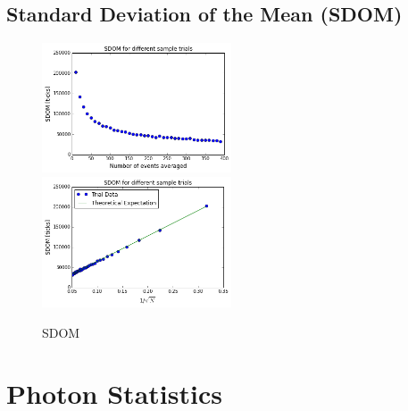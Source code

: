 \documentclass[authoryear, 12pt,5p, Times]{elsarticle}
\begin{document}
	\subsection{Standard Deviation of the Mean (SDOM)}
	 	\begin{figure}[h]
		\includegraphics[width=0.5\textwidth]{figures/sdom_exp_graph}
		\includegraphics[width=0.5\textwidth]{figures/sdom_linear}
		\caption{SDOM}
		\label{stat_converging}
	\end{figure}
\section{Photon Statistics\label{pstats}}
	
\end{document}
